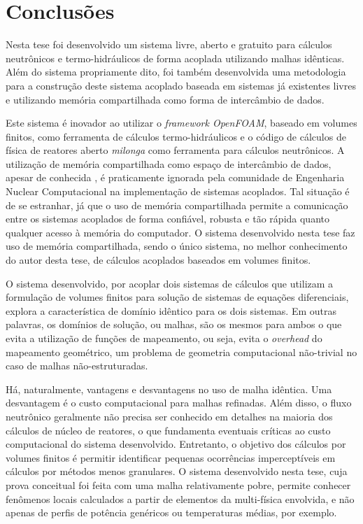\chapter{Conclusões}
\label{chap:conclusoes}

Nesta tese foi desenvolvido um sistema livre, aberto e gratuito para
cálculos neutrônicos e termo-hidráulicos de forma acoplada utilizando
malhas idênticas. Além do sistema propriamente dito, foi também desenvolvida
uma metodologia para a construção deste sistema acoplado baseada em sistemas
já existentes livres e utilizando memória compartilhada como forma de
intercâmbio de dados.

Este sistema é inovador ao utilizar o \textit{framework OpenFOAM}, baseado
em volumes finitos, como ferramenta de cálculos termo-hidráulicos e o
código de cálculos de física de reatores aberto \textit{milonga} como ferramenta
para cálculos neutrônicos. A utilização de memória compartilhada como
espaço de intercâmbio de dados, apesar de conhecida \cite{Maciel2011, Theler2013},
é praticamente ignorada pela comunidade de Engenharia Nuclear Computacional na
implementação de sistemas acoplados. Tal situação é de se estranhar, já que o
uso de memória compartilhada permite a comunicação entre os sistemas acoplados
de forma confiável, robusta e tão rápida quanto qualquer acesso à memória
do computador. O sistema desenvolvido nesta tese faz uso de memória compartilhada,
sendo o único sistema, no melhor conhecimento do autor desta tese, de cálculos acoplados baseados em volumes finitos. 

O sistema desenvolvido, por acoplar dois sistemas de cálculos que utilizam
a formulação de volumes finitos para solução de sistemas de equações diferenciais,
explora a característica de domínio idêntico para os dois sistemas. Em outras palavras,
os domínios de solução, ou malhas, são os mesmos para ambos o que evita a utilização
de funções de mapeamento, ou seja, evita o \textit{overhead} do mapeamento geométrico,
um problema de geometria computacional não-trivial no caso de malhas não-estruturadas.

Há, naturalmente, vantagens e desvantagens no uso de malha idêntica. Uma desvantagem
é o custo computacional para malhas refinadas. Além disso, o fluxo neutrônico geralmente
não precisa ser conhecido em detalhes na maioria dos cálculos de núcleo de reatores,
o que fundamenta eventuais críticas ao custo computacional do sistema desenvolvido. 
Entretanto, o objetivo dos cálculos por volumes
finitos é permitir identificar pequenas ocorrências imperceptíveis
em cálculos por métodos menos granulares. O sistema desenvolvido nesta tese, cuja
prova conceitual foi feita com uma malha relativamente pobre, permite conhecer fenômenos
locais calculados a partir de elementos da multi-física envolvida, e não apenas
de perfis de potência genéricos ou temperaturas médias, por exemplo. 

